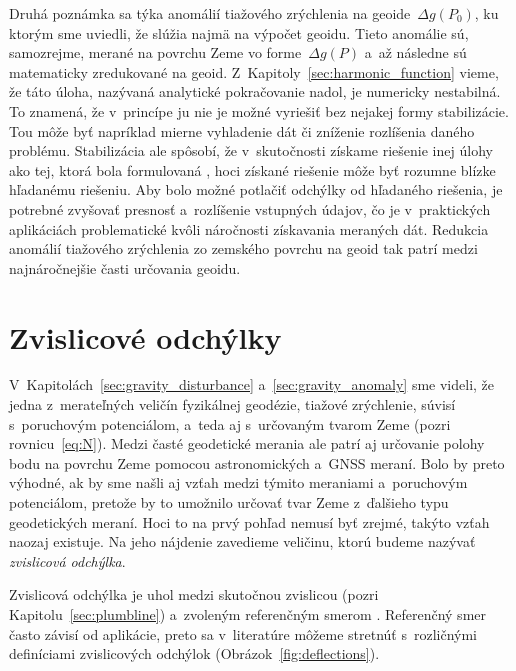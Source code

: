\documentclass[a4paper,12pt]{book}
\begin{document}
Druhá poznámka sa týka anomálií tiažového zrýchlenia na geoide~$\Delta g(P_0)$, 
ku ktorým sme uviedli, že slúžia najmä na výpočet geoidu.  Tieto anomálie sú, 
samozrejme, merané na povrchu Zeme vo forme~$\Delta g(P)$ a~až následne sú 
matematicky zredukované na geoid.  Z~Kapitoly~\ref{sec:harmonic_function} 
vieme, že táto úloha, nazývaná analytické pokračovanie nadol, je numericky 
nestabilná.  To znamená, že v~princípe ju nie je možné vyriešiť bez nejakej 
formy stabilizácie.  Tou môže byť napríklad mierne vyhladenie dát či zníženie 
rozlíšenia daného problému.  Stabilizácia ale spôsobí, že v~skutočnosti získame 
riešenie inej úlohy ako tej, ktorá bola formulovaná 
\parencite{SansoGeodeticBoundaryValueProblem}, hoci získané riešenie môže byť 
rozumne blízke hľadanému riešeniu.  Aby bolo možné potlačiť odchýlky od 
hľadaného riešenia, je potrebné zvyšovať presnosť a~rozlíšenie vstupných 
údajov, čo je v~praktických aplikáciách problematické kvôli náročnosti 
získavania meraných dát.  Redukcia anomálií tiažového zrýchlenia zo zemského 
povrchu na geoid tak patrí medzi najnáročnejšie časti určovania geoidu.






\section{Zvislicové odchýlky}
\label{sec:deflections}

V~Kapitolách~\ref{sec:gravity_disturbance} a~\ref{sec:gravity_anomaly} sme 
videli, že jedna z~merateľných veličín fyzikálnej geodézie, tiažové zrýchlenie, 
súvisí s~poruchovým potenciálom, a~teda aj s~určovaným tvarom Zeme (pozri 
rovnicu~\ref{eq:N}).  Medzi časté geodetické merania ale patrí aj určovanie 
polohy bodu na povrchu Zeme pomocou astronomických a~GNSS meraní.  Bolo by 
preto výhodné, ak by sme našli aj vzťah medzi týmito meraniami a~poruchovým 
potenciálom, pretože by to umožnilo určovať tvar Zeme z~ďalšieho typu 
geodetických meraní.  Hoci to na prvý pohľad nemusí byť zrejmé, takýto vzťah 
naozaj existuje.  Na jeho nájdenie zavedieme veličinu, ktorú budeme nazývať 
\emph{zvislicová odchýlka}.

Zvislicová odchýlka je uhol medzi skutočnou zvislicou (pozri 
Kapitolu~\ref{sec:plumbline}) a~zvoleným referenčným smerom 
\parencite{TorgeGeodesy}.  Referenčný smer často závisí od aplikácie, preto sa 
v~literatúre môžeme stretnúť s~rozličnými definíciami zvislicových odchýlok 
(Obrázok~\ref{fig:deflections}).
\end{document}
